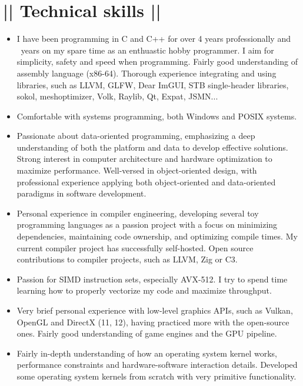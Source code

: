 \section*{|| Technical skills ||}
\begin{itemize}
	\item I have been programming in C and C++ for over 4 years professionally and \number\numexpr{}\relax~years on my spare time as an enthuastic hobby programmer. I aim for simplicity, safety and speed when programming. Fairly good understanding of assembly language (x86-64). Thorough experience integrating and using libraries, such as LLVM, GLFW, Dear ImGUI, STB single-header libraries, sokol, meshoptimizer, Volk, Raylib, Qt, Expat, JSMN...
	
	\item Comfortable with systems programming, both Windows and POSIX systems.
	
	\item Passionate about data-oriented programming, emphasizing a deep understanding of both the platform and data to develop effective solutions. Strong interest in computer architecture and hardware optimization to maximize performance. Well-versed in object-oriented design, with professional experience applying both object-oriented and data-oriented paradigms in software development.
	
	\item Personal experience in compiler engineering, developing several toy programming languages as a passion project with a focus on minimizing dependencies, maintaining code ownership, and optimizing compile times. My current compiler project has successfully self-hosted. Open source contributions to compiler projects, such as LLVM, Zig or C3.
	
	\item Passion for SIMD instruction sets, especially AVX-512. I try to spend time learning how to properly vectorize my code and maximize throughput.
	
	\item Very brief personal experience with low-level graphics APIs, such as Vulkan, OpenGL and DirectX (11, 12), having practiced more with the open-source ones. Fairly good understanding of game engines and the GPU pipeline.
	
	\item Fairly in-depth understanding of how an operating system kernel works, performance constraints and hardware-software interaction details. Developed some operating system kernels from scratch with very primitive functionality.
	

\end{itemize}

